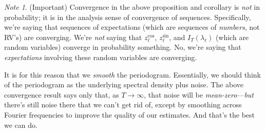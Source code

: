 \documentclass[12pt]{article}
\theoremstyle{plain}
\theoremstyle{definition}
\theoremstyle{remark}
\newtheorem*{note}{Note}
\newcommand{\ra}{\rightarrow}
\begin{document}
\begin{note}
(Important)
Convergence in the above proposition and corollary is \emph{not} in
probability; it is in the analysis sense of convergence of sequences.
Specifically, we're saying that sequences of expectations (which are
sequences of \emph{numbers}, not RV's) are converging.
We're \emph{not} saying that $z^{\cos}_\ell$, $z^{\sin}_\ell$, and
$I_T(\lambda_\ell)$ (which are random variables) converge in probability
something.  No, we're saying that \emph{expectations} involving these
random variables are converging.

It is for this reason that we \emph{smooth} the periodogram.
Essentially, we should think of the periodogram as the underlying
spectral density plus noise. The above convergence result says only
that, as $T\ra\infty$, that noise will be \emph{mean-zero}---\emph{but}
there's still noise there that we can't get rid of, except by smoothing
across Fourier frequencies to improve the quality of our estimates. And
that's the best we can do.
\end{note}
\end{document}
